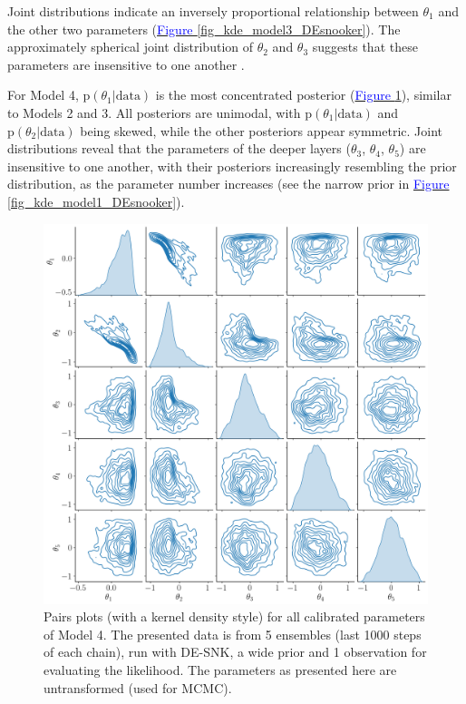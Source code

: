 \FloatBarrier
\clearpage
\noindent Joint distributions indicate an inversely proportional relationship between $\theta_1$ and the other two parameters (\hyperref[fig_kde_model3_DEsnooker]{\textcolor{blue}{Figure }\ref{fig_kde_model3_DEsnooker}}). The approximately spherical joint distribution of $\theta_2$ and $\theta_3$ suggests that these parameters are insensitive to one another \citep{gelman2021bayesian}.  

For Model 4, $\text{p}(\theta_1 | \text{data})$ is the most concentrated posterior (\hyperref[fig_kde_model4_DEsnooker]{\textcolor{blue}{Figure }\ref{fig_kde_model4_DEsnooker}}), similar to Models 2 and 3. All posteriors are unimodal, with $\text{p}(\theta_1 | \text{data})$ and $\text{p}(\theta_2 | \text{data})$ being skewed, while the other posteriors appear symmetric. Joint distributions reveal that the parameters of the deeper layers ($\theta_3$, $\theta_4$, $\theta_5$) are insensitive to one another, with their posteriors increasingly resembling the prior distribution, as the parameter number increases (see the narrow prior in \hyperref[fig_kde_model1_DEsnooker]{\textcolor{blue}{Figure }\ref{fig_kde_model1_DEsnooker}}).

\begin{figure}[htb!]
\centering
\includegraphics[width=1.0\linewidth]{Figures/kde_model4_DEsnooker.png}
\caption{Pairs plots (with a kernel density style) for all calibrated parameters of Model 4. The presented data is from 5 ensembles (last 1000 steps of each chain), run with DE-SNK, a wide prior and 1 observation for evaluating the likelihood. The parameters as presented here are untransformed (used for MCMC).}\label{fig_kde_model4_DEsnooker}
\end{figure}